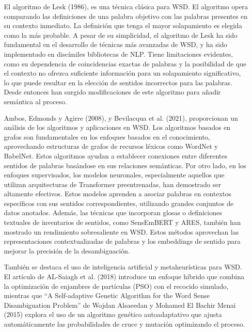 El algoritmo de Lesk (1986), es una técnica clásica para WSD. El algoritmo opera comparando las definiciones de una palabra objetivo con las palabras presentes en su contexto inmediato. La definici\'on que tenga el mayor solapamiento es elegida como la más probable. A pesar de su simplicidad, el algoritmo de Lesk ha sido fundamental en el desarrollo de técnicas más avanzadas de WSD, y ha sido implementado en disc\'imiles bibliotecas de NLP. Tiene limitaciones evidentes, como su dependencia de coincidencias exactas de palabras y la posibilidad de que el contexto no ofrezca suficiente información para un solapamiento significativo, lo que puede resultar en la elección de sentidos incorrectos para las palabras. Desde entonces han surgido modificaciones de este algoritmo para a\~nadir sem\'antica al proceso. 

Ambos, Edmonds y Agirre (2008), y Bevilacqua et al. (2021), proporcionan un análisis de los algoritmos y aplicaciones en WSD. Los algoritmos basados en grafos son fundamentales en los enfoques basados en el conocimiento, aprovechando estructuras de grafos de recursos léxicos como WordNet y BabelNet. Estos algoritmos ayudan a establecer conexiones entre diferentes sentidos de palabras basándose en sus relaciones semánticas. Por otro lado, en los enfoques supervisados, los modelos neuronales, especialmente aquellos que utilizan arquitecturas de Transformer preentrenadas, han demostrado ser altamente efectivos. Estos modelos aprenden a asociar palabras en contextos específicos con sus sentidos correspondientes, utilizando grandes conjuntos de datos anotados. Además, las técnicas que incorporan glosas o definiciones textuales de inventarios de sentidos, como SensEmBERT y ARES, también han mostrado un rendimiento sobresaliente en WSD. Estos métodos aprovechan las representaciones contextualizadas de palabras y los embeddings de sentido para mejorar la precisión de la desambiguación.

Tambi\'en se destaca el uso de inteligencia artificial y metaheur\'isticas para WSD. El art\'iculo de AL-Saiagh et al. (2018) introduce un enfoque híbrido que combina la optimización de enjambres de partículas (PSO) con el recocido simulado, mientras que ``A Self-adaptive Genetic Algorithm for the Word Sense Disambiguation Problem'' de Wojdan Alsaeedan y Mohamed El Bachir Menai (2015) explora el uso de un algoritmo genético autoadaptativo que ajusta automáticamente las probabilidades de cruce y mutación optimizando el proceso.
